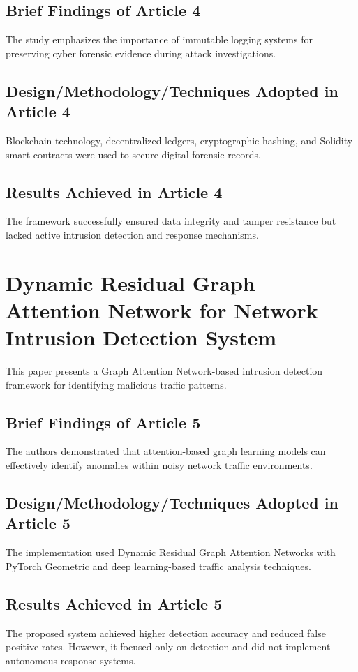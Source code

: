 \documentclass[12pt,a4paper]{report}
\begin{document}
\subsection{Brief Findings of Article 4}
The study emphasizes the importance of immutable logging systems for preserving cyber forensic evidence during attack investigations.

\subsection{Design/Methodology/Techniques Adopted in Article 4}
Blockchain technology, decentralized ledgers, cryptographic hashing, and Solidity smart contracts were used to secure digital forensic records.

\subsection{Results Achieved in Article 4}
The framework successfully ensured data integrity and tamper resistance but lacked active intrusion detection and response mechanisms.

\section{Dynamic Residual Graph Attention Network for Network Intrusion Detection System \cite{paper5}}
This paper presents a Graph Attention Network-based intrusion detection framework for identifying malicious traffic patterns.

\subsection{Brief Findings of Article 5}
The authors demonstrated that attention-based graph learning models can effectively identify anomalies within noisy network traffic environments.

\subsection{Design/Methodology/Techniques Adopted in Article 5}
The implementation used Dynamic Residual Graph Attention Networks with PyTorch Geometric and deep learning-based traffic analysis techniques.

\subsection{Results Achieved in Article 5}
The proposed system achieved higher detection accuracy and reduced false positive rates. However, it focused only on detection and did not implement autonomous response systems.
\end{document}
